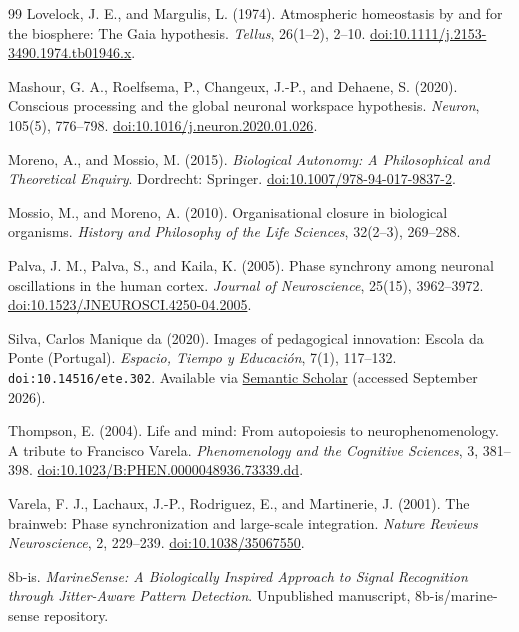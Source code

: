 \documentclass[11pt]{article}
\begin{document}
\begin{thebibliography}{99}
Lovelock, J. E., and Margulis, L. (1974). Atmospheric homeostasis by and for the biosphere: The Gaia hypothesis. \emph{Tellus}, 26(1--2), 2--10. \href{https://doi.org/10.1111/j.2153-3490.1974.tb01946.x}{doi:10.1111/j.2153-3490.1974.tb01946.x}.

Mashour, G. A., Roelfsema, P., Changeux, J.-P., and Dehaene, S. (2020). Conscious processing and the global neuronal workspace hypothesis. \emph{Neuron}, 105(5), 776--798. \href{https://doi.org/10.1016/j.neuron.2020.01.026}{doi:10.1016/j.neuron.2020.01.026}.

Moreno, A., and Mossio, M. (2015). \emph{Biological Autonomy: A Philosophical and Theoretical Enquiry}. Dordrecht: Springer. \href{https://doi.org/10.1007/978-94-017-9837-2}{doi:10.1007/978-94-017-9837-2}.

Mossio, M., and Moreno, A. (2010). Organisational closure in biological organisms. \emph{History and Philosophy of the Life Sciences}, 32(2--3), 269--288.

Palva, J. M., Palva, S., and Kaila, K. (2005). Phase synchrony among neuronal oscillations in the human cortex. \emph{Journal of Neuroscience}, 25(15), 3962--3972. \href{https://doi.org/10.1523/JNEUROSCI.4250-04.2005}{doi:10.1523/JNEUROSCI.4250-04.2005}.

Silva, Carlos Manique da (2020). Images of pedagogical innovation: Escola da Ponte (Portugal). \emph{Espacio, Tiempo y Educaci\'on}, 7(1), 117--132. \nolinkurl{doi:10.14516/ete.302}. Available via \href{https://www.semanticscholar.org/paper/Images-of-Pedagogical-Innovation%3A-Escola-da-Ponte-Silva/fedd3b164707396873a9e91a3f4f2815df1db0b4}{Semantic Scholar} (accessed September 2026).

Thompson, E. (2004). Life and mind: From autopoiesis to neurophenomenology. A tribute to Francisco Varela. \emph{Phenomenology and the Cognitive Sciences}, 3, 381--398. \href{https://doi.org/10.1023/B:PHEN.0000048936.73339.dd}{doi:10.1023/B:PHEN.0000048936.73339.dd}.

Varela, F. J., Lachaux, J.-P., Rodriguez, E., and Martinerie, J. (2001). The brainweb: Phase synchronization and large-scale integration. \emph{Nature Reviews Neuroscience}, 2, 229--239. \href{https://doi.org/10.1038/35067550}{doi:10.1038/35067550}.

8b-is. \emph{MarineSense: A Biologically Inspired Approach to Signal Recognition through Jitter-Aware Pattern Detection}. Unpublished manuscript, 8b-is/marine-sense repository.


\end{thebibliography}
\end{document}
